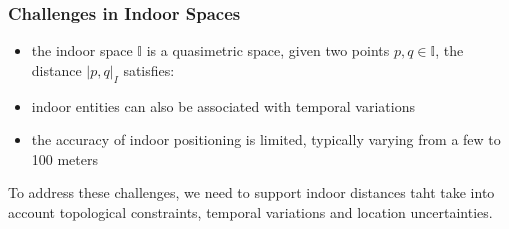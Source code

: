 
\begin{frame}
\frametitle{Challenges in Indoor Spaces}

\begin{itemize}
  \item the indoor space $\mathbb{I}$ is a quasimetric space, given two points $p, q \in \mathbb{I}$, the distance $|p, q|_I$ satisfies:
  \item indoor entities can also be associated with temporal variations
  \item the accuracy of indoor positioning is limited, typically varying from a few to 100 meters
\end{itemize}

\textrm{To address these challenges, we need to support indoor distances taht take into account topological constraints, temporal variations and location uncertainties.}

\end{frame}


